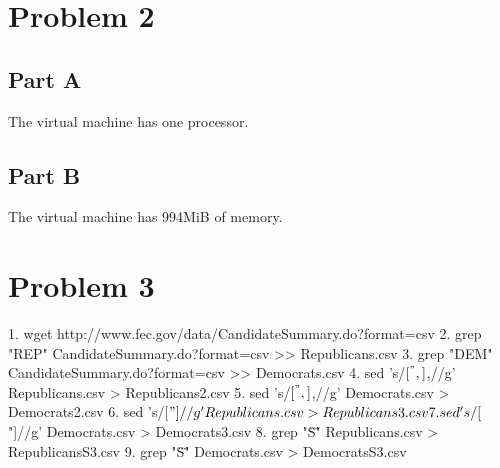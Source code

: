 \section{Problem 2}
\subsection{Part A}
The virtual machine has one processor.
\subsection{Part B}
The virtual machine has 994MiB of memory.
\section{Problem 3}
1. wget http://www.fec.gov/data/CandidateSummary.do?format=csv
2. grep "REP" CandidateSummary.do?format=csv >> Republicans.csv
3. grep "DEM" CandidateSummary.do?format=csv >> Democrats.csv
4. sed 's/\([^",]\),/\1/g' Republicans.csv > Republicans2.csv
5. sed 's/\([^",]\),/\1/g' Democrats.csv > Democrats2.csv
6. sed 's/[$"]//g' Republicans.csv > Republicans3.csv
7. sed 's/[$"]//g' Democrats.csv > Democrats3.csv
8. grep "\"S\"" Republicans.csv > RepublicansS3.csv
9. grep "\"S\"" Democrats.csv > DemocratsS3.csv

